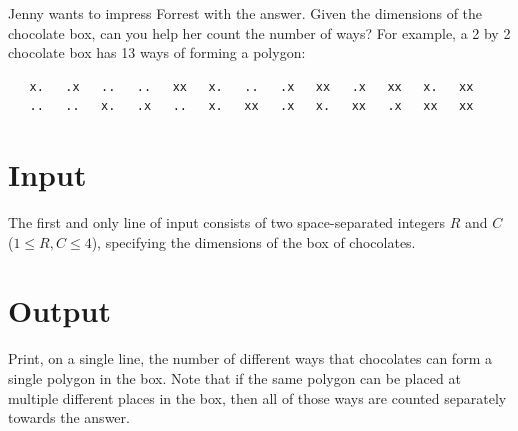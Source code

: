 Jenny wants to impress Forrest with the answer. Given the dimensions of the chocolate box, can you help her count the number of ways? For example, a 2 by 2 chocolate box has 13 ways of forming a polygon:
\begin{verbatim}
   x.   .x   ..   ..   xx   x.   ..   .x   xx   .x   xx   x.   xx
   ..   ..   x.   .x   ..   x.   xx   .x   x.   xx   .x   xx   xx
\end{verbatim}

\section*{Input}
The first and only line of input consists of two space-separated integers $R$ and $C$ ($1 \leq R, C \leq 4$), specifying the dimensions of the box of chocolates.

\section*{Output}
Print, on a single line, the number of different ways that chocolates can form a single polygon in the box. Note that if the same polygon can be placed at multiple different places in the box, then all of those ways are counted separately towards the answer.
